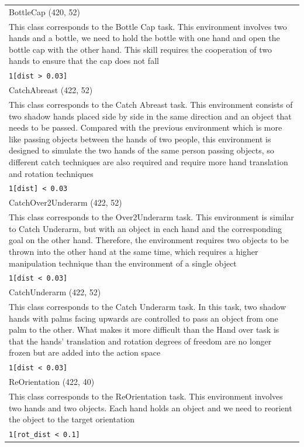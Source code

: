 \begin{tabularx}{\textwidth}{X}
    \hline
    BottleCap (420, 52) \\ This class corresponds to the Bottle Cap task. This environment involves two hands and a bottle, we  need to hold the bottle with one hand and open the bottle cap with the other hand. This skill requires  the cooperation of two hands to ensure that the cap does not fall \\ \verb|1[dist > 0.03]| \\[1px]
    \hline
    CatchAbreast (422, 52) \\ This class corresponds to the Catch Abreast task. This environment consists of two shadow hands placed side by side in the same direction and an object that needs to be passed. Compared with the previous  environment which is more like passing objects between the hands of two people, this environment is designed to simulate the two hands of the same person passing objects, so different catch techniques are also required and require more hand translation and rotation techniques \\ \verb|1[dist] < 0.03| \\[1px]
    \hline
    CatchOver2Underarm (422, 52) \\ This class corresponds to the Over2Underarm task. This environment is similar to Catch Underarm,  but with an object in each hand and the corresponding goal on the other hand. Therefore, the environment  requires two objects to be thrown into the other hand at the same time, which requires a higher  manipulation technique than the environment of a single object \\ \verb|1[dist < 0.03]| \\[1px]
    \hline
    CatchUnderarm (422, 52) \\ This class corresponds to the Catch Underarm task. In this task, two shadow hands with palms facing upwards are controlled to pass an object from one palm to the other. What makes it more difficult  than the Hand over task is that the hands' translation and rotation degrees of freedom are no longer frozen but are added into the action space \\ \verb|1[dist < 0.03]| \\[1px]
    \hline
    ReOrientation (422, 40) \\ This class corresponds to the ReOrientation task. This environment involves two hands and two objects.  Each hand holds an object and we need to reorient the object to the target orientation \\ \verb|1[rot_dist < 0.1]| \\[1px]

\end{tabularx}
